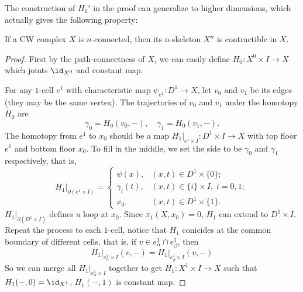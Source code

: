     The construction of $H_1'$ in the proof can generalize to higher 
    dimensions, which actually gives the following property: 
    \begin{proposition}
        If a CW complex $X$ is $n$-connected, then its n-skeleton $X^n$ is 
        contractible in $X$.
    \end{proposition}
    \begin{proof}
        First by the path-connectness of $X$, we can easily define 
        $H_0:X^0\times I\to X$ which joints $\id_{X^0}$ and constant map. 
        
        For any $1$-cell $e^1$ with characteristic map $\psi_{e^1}:D^1\to X$, 
        let $v_0$ and $v_1$ be its edges (they may be the same vertex). 
        The trajectories of $v_0$ and $v_1$ under the homotopy $H_0$ are 
        \begin{equation*}
            \gamma_0 = H_0(v_0,-),\quad \gamma_1=H_0(v_1,-).
        \end{equation*}
        The homotopy from $e^1$ to $x_0$ should be a map 
        $H_1\big|_{e^1\times I}:D^1\times I\to X$ with top floor $e^1$ and 
        bottom floor $x_0$. To fill in the middle, we set the side to be 
        $\gamma_0$ and $\gamma_1$ respectively, that is, 
        \begin{equation*}
            H_1\big|_{\partial(e^1\times I)} = 
            \begin{cases}
                \psi(x), &(x,t)\in D^1\times\{0\};\\
                \gamma_i(t),&(x,t)\in \{i\}\times I,\;i=0,1;\\
                x_0,&(x,t)\in D^1\times\{1\}.
            \end{cases}
        \end{equation*}
        $H_1\big|_{\partial(D^1\times I)}$ defines a loop at $x_0$. Since 
        $\pi_1(X,x_0) = 0$, $H_1$ can extend to $D^1\times I$. Repeat the 
        process to each $1$-cell, notice that $H_1$ conicides at the 
        common boundary of different cells, that is, if 
        $v\in e^1_\alpha\cap e^1_\beta$, then 
        \begin{equation*}
        H_1\big|_{e^1_\alpha\times I}(v,-)
        =H_1\big|_{e^1_\beta\times I}(v,-)
        \end{equation*}
        So we can merge all $H_1\big|_{e^1_\alpha\times I}$ together to get 
        $H_1:X^1\times I\to X$ such that $H_1(-,0)=\id_{X^1}$, 
        $H_1(-,1)$ is constant map. 


\end{proof}
